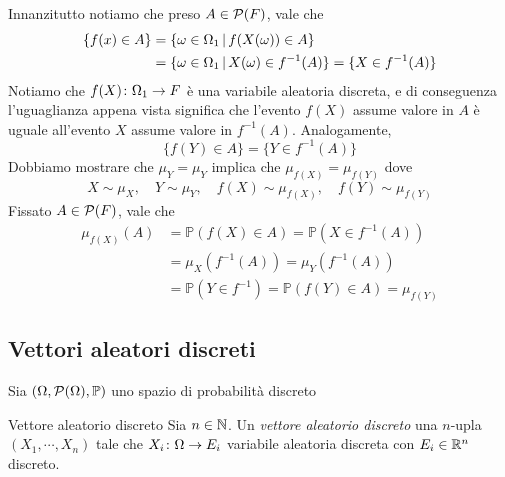 \documentclass[a4paper]{article}
\begin{document}
\begin{snippetproof}{}
    Innanzitutto notiamo che preso \(A \in \mathcal P(F)\),
    vale che
    \begin{align*}
        \{
            f(x) \in A
        \}
        &= \{
            \omega \in \Omega_1 \,|\, f(X(\omega)) \in A
        \} \\
        &= \{
            \omega \in \Omega_1 \,|\, X(\omega) \in f^{-1}(A)
        \} = \{X \in f^{-1}(A)\}
    \end{align*}
    Notiamo che \(f(X) \colon \Omega_1 \to F\) è una variabile aleatoria discreta,
    e di conseguenza l'uguaglianza appena vista significa che l'evento
    \(f(X)\) assume valore in \(A\) è uguale all'evento \(X\)
    assume valore in \(f^{-1}(A)\).
    Analogamente,
    \[
        \{f(Y) \in A \} = \{Y \in f^{-1}(A)\}
    \]
    Dobbiamo mostrare che \(\mu_Y = \mu_Y\)
    implica che \(\mu_{f(X)} = \mu_{f(Y)}\)
    dove \[
        X \sim \mu_X, \quad
        Y \sim \mu_Y, \quad
        f(X) \sim \mu_{f(X)}, \quad
        f(Y) \sim \mu_{f(Y)}
    \]
    Fissato \(A \in \mathcal P(F)\), vale che
    \begin{align*}
        \mu_{f(X)}(A) &=
        \mathbb P(f(X) \in A) = \mathbb P(X \in f^{-1}(A)) \\
        &= \mu_X(f^{-1}(A)) = \mu_Y(f^{-1}(A)) \\
        &= \mathbb P(Y \in f^{-1}) = \mathbb P(f(Y) \in A)
        = \mu_{f(Y)}
    \end{align*}
\end{snippetproof}

\subsection{Vettori aleatori discreti}

Sia \((\Omega, \mathcal P(\Omega), \mathbb P)\)
uno spazio di probabilità discreto

\begin{snippetdefinition}{Vettore aleatorio discreto}
    Sia \(n \in \mathbb{N}\).
    Un \emph{vettore aleatorio discreto}
    una \(n\)-upla \((X_1, \cdots, X_n)\)
    tale che
    \(X_i \colon \Omega \to E_i\) variabile aleatoria discreta
    con \(E_i \in \mathbb{R}^n\) discreto.
\end{snippetdefinition}
\end{document}

